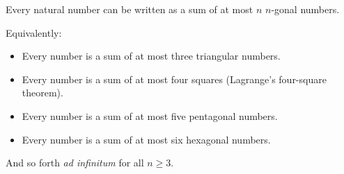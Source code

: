 Every natural number can be written as a sum of at most $n$ $n$-gonal numbers.

Equivalently:
\begin{itemize}
\item Every number is a sum of at most three triangular numbers.
\item Every number is a sum of at most four squares (Lagrange's four-square theorem).
\item Every number is a sum of at most five pentagonal numbers.
\item Every number is a sum of at most six hexagonal numbers.
\end{itemize}
And so forth \textit{ad infinitum} for all $n \geq 3$.
